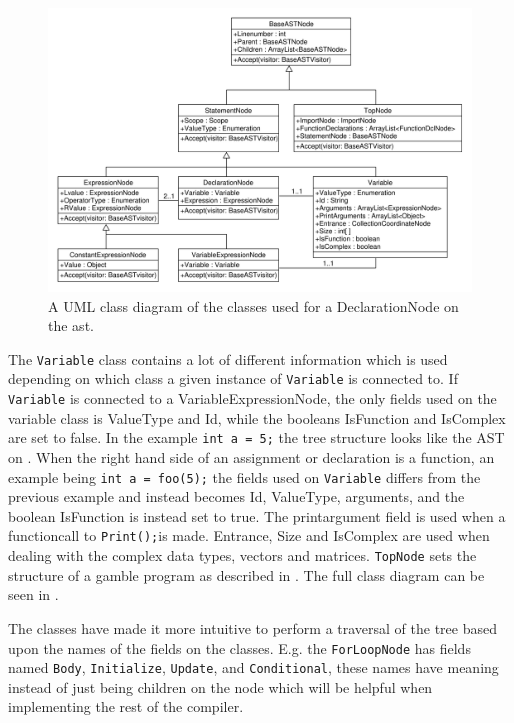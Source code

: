 \begin{figure}[!ht]
\centering
 \includegraphics[width=1\textwidth]{figures/ClassDiagrams/ASTDeclarationNodeMoreInfo.pdf} %
\caption{A UML class diagram of the classes used for a DeclarationNode on the \acrshort{ast}.}\label{image:ASTDecl}
\vspace{-15pt}
\end{figure}

The \texttt{Variable} class contains a lot of different information which is used depending on which class a given instance of \texttt{Variable} is connected to.
If \texttt{Variable} is connected to a VariableExpressionNode, the only fields used on the variable class is ValueType and Id, while the booleans IsFunction and IsComplex are set to false.
In the example \texttt{int a = 5;} the tree structure looks like the AST on .
When the right hand side of an assignment or declaration is a function, an example being \texttt{int a = foo(5);} the fields used on \texttt{Variable} differs from the previous example and instead becomes Id, ValueType, arguments, and the boolean IsFunction is instead set to true.
The printargument field is used when a functioncall to \texttt{Print();}is made. 
Entrance, Size and IsComplex are used when dealing with the complex data types, vectors and matrices.
\texttt{TopNode} sets the structure of a \gls{gamble} program as described in .
The full class diagram can be seen in .

The classes have made it more intuitive to perform a traversal of the tree based upon the names of the fields on the classes.
E.g. the \texttt{ForLoopNode} has fields named \texttt{Body}, \texttt{Initialize}, \texttt{Update}, and \texttt{Conditional}, these names have meaning instead of just being children on the node which will be helpful when implementing the rest of the compiler.
